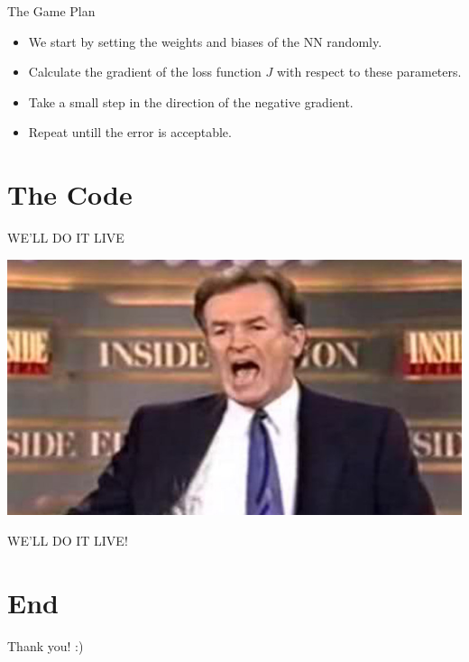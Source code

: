 \documentclass[11pt]{beamer}
\begin{document}
\begin{frame}{The Game Plan}
\begin{itemize}
\item We start by setting the weights and biases of the NN randomly.
\item Calculate the gradient of the loss function $J$ with respect to these parameters.
\item Take a small step in the direction of the negative gradient.
\item Repeat untill the error is acceptable.
\end{itemize}
\end{frame}

\section{The Code}

\begin{frame}{WE'LL DO IT LIVE}
\begin{center}
\includegraphics[scale=0.3]{114486a48d800d14f972cb0e74f7b0d9}

WE'LL DO IT LIVE!
\end{center}
\end{frame}

\section{End}

\begin{frame}
\begin{center}
Thank you! :)
\end{center}
\end{frame}
\end{document}
